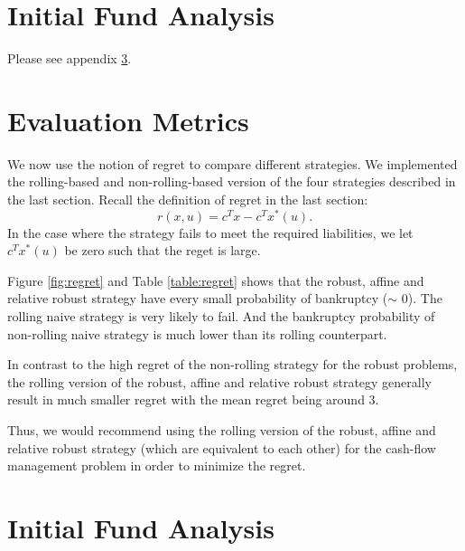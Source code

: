 \documentclass{article}
\begin{document}

\section{Initial Fund Analysis}

Please see appendix \ref{apx:InitialFundAnalysis}.

\section{\textbf{Evaluation Metrics}}

    We now use the notion of regret to compare different strategies. We implemented the rolling-based and non-rolling-based version of the four strategies described in the last section. Recall the definition of regret in the last section:
    \[
        r(x, u) =  c^Tx - c^Tx^*(u).
    \]
    In the case where the strategy fails to meet the required liabilities, we let $c^Tx^*(u)$ be zero such that the reget is large.

    Figure \ref{fig:regret} and Table \ref{table:regret} shows that the robust, affine and relative robust strategy have every small probability of bankruptcy ($\sim$ 0). The rolling naive strategy is very likely to fail. And the bankruptcy probability of non-rolling naive strategy is much lower than its rolling counterpart. 

    In contrast to the high regret of the non-rolling strategy for the robust problems, the rolling version of the robust, affine and relative robust strategy generally result in much smaller regret with the mean regret being around 3. 

    Thus, we would recommend using the rolling version of the robust, affine and relative robust strategy (which are equivalent to each other) for the cash-flow management problem in order to minimize the regret.





\clearpage
\newpage
\appendix

\onecolumn







\section{Initial Fund Analysis}\label{apx:InitialFundAnalysis}
\end{document}
